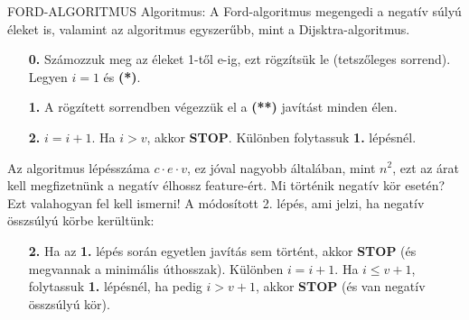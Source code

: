 \begin{framed}
FORD-ALGORITMUS Algoritmus: A Ford-algoritmus megengedi a negatív súlyú éleket is, valamint az algoritmus egyszerűbb, mint a Dijsktra-algoritmus.
\begin{itemize}
\item[\textbf{0.}] Számozzuk meg az éleket 1-től e-ig, ezt rögzítsük le (tetszőleges sorrend). Legyen $i = 1$ és \textbf{(*)}.
\item[\textbf{1.}] A rögzített sorrendben végezzük el a \textbf{(**)} javítást minden élen.
\item[\textbf{2.}] $i = i + 1$. Ha $i > v$, akkor \textbf{STOP}. Különben folytassuk \textbf{1.} lépésnél.
\end{itemize}
Az algoritmus lépésszáma $c\cdot e\cdot v$, ez jóval nagyobb általában, mint $n^2$, ezt az árat kell megfizetnünk a negatív élhossz feature-ért. Mi történik negatív kör esetén? Ezt valahogyan fel kell ismerni! A módosított 2. lépés, ami jelzi, ha negatív összsúlyú körbe kerültünk:
\begin{itemize}
\item[\textbf{2.}] Ha az \textbf{1.} lépés során egyetlen javítás sem történt, akkor \textbf{STOP} (és megvannak a minimális úthosszak). Különben $i = i + 1$. Ha $i \leq v + 1$, folytassuk \textbf{1.} lépésnél, ha pedig $i > v + 1$, akkor \textbf{STOP} (és van negatív összsúlyú kör).
\end{itemize}
\end{framed}
